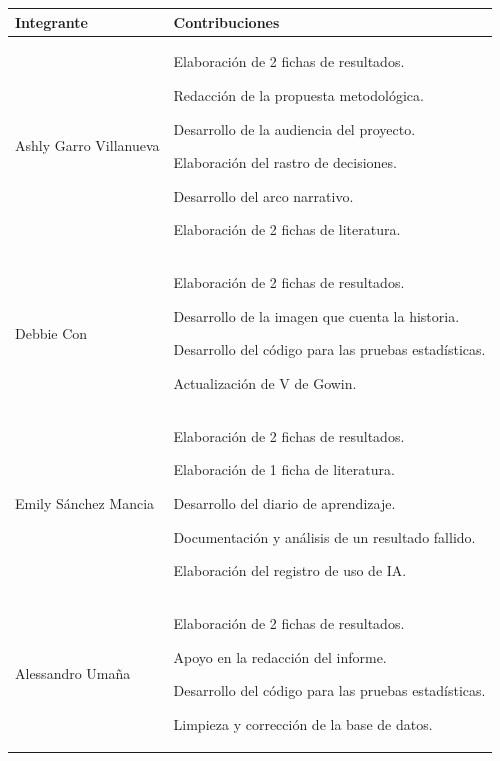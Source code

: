 \documentclass[12pt]{article}
\begin{document}
\begin{tabular}{|p{3cm}|p{8cm}|}
\hline
\textbf{Integrante} & \textbf{Contribuciones} \\ \hline

Ashly Garro Villanueva &
Elaboración de 2 fichas de resultados. \par
Redacción de la propuesta metodológica. \par
Desarrollo de la audiencia del proyecto. \par
Elaboración del rastro de decisiones. \par
Desarrollo del arco narrativo. \par
Elaboración de 2 fichas de literatura.
\\ \hline

Debbie Con &
Elaboración de 2 fichas de resultados. \par
Desarrollo de la imagen que cuenta la historia. \par
Desarrollo del código para las pruebas estadísticas. \par
Actualización de V de Gowin. 
\\ \hline

Emily Sánchez Mancia &
Elaboración de 2 fichas de resultados. \par
Elaboración de 1 ficha de literatura. \par
Desarrollo del diario de aprendizaje. \par
Documentación y análisis de un resultado fallido. \par
Elaboración del registro de uso de IA.
\\ \hline

Alessandro Umaña &
Elaboración de 2 fichas de resultados. \par
Apoyo en la redacción del informe. \par
Desarrollo del código para las pruebas estadísticas. \par
Limpieza y corrección de la base de datos.
\\ \hline
\end{tabular}

\newpage
\printbibliography
\end{document}
